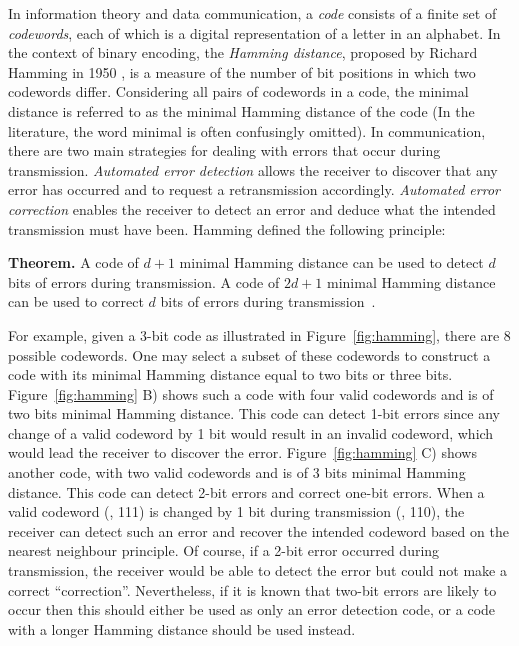 In information theory and data communication, a \emph{code} consists of a finite set of \emph{codewords}, each of which is a digital representation of a letter in an alphabet.
In the context of binary encoding, the \emph{Hamming distance}, proposed by Richard Hamming in 1950 \cite{Hamming:1950:Bell}, is a measure of the number of bit positions in which two codewords differ.
Considering all pairs of codewords in a code, the minimal distance is referred to as the minimal Hamming distance of the code (In the literature, the word minimal is often confusingly omitted).
In communication, there are two main strategies for dealing with errors that occur during transmission.
\emph{Automated error detection} allows the receiver to discover that any error has occurred and to request a retransmission accordingly.
\emph{Automated error correction} enables the receiver to detect an error and deduce what the intended transmission must have been.
Hamming defined the following principle:

\noindent \textbf{Theorem.} A code of $d+1$ minimal Hamming distance can be used to detect $d$ bits of errors during transmission. A code of $2d+1$ minimal Hamming distance can be used to correct $d$ bits of errors during transmission~\cite{Hamming:1950:Bell}.

For example, given a 3-bit code as illustrated in Figure~\ref{fig:hamming}, there are 8 possible codewords.
One may select a subset of these codewords to construct a code with its minimal Hamming distance equal to two bits or three bits.
Figure~\ref{fig:hamming} B) shows such a code with four valid codewords and is of two bits minimal Hamming distance.
This code can detect 1-bit errors since any change of a valid codeword by 1 bit would result in an invalid codeword, which would lead the receiver to discover the error.
Figure~\ref{fig:hamming} C) shows another code, with two valid codewords and is of 3 bits minimal Hamming distance.
This code can detect 2-bit errors and correct one-bit errors.
When a valid codeword (\eg, 111) is changed by 1 bit during transmission (\eg, 110), the receiver can detect such an error and recover the intended codeword based on the nearest neighbour principle.
Of course, if a 2-bit error occurred during transmission, the receiver would be able to detect the error but could not make a correct ``correction''.
Nevertheless, if it is known that two-bit errors are likely to occur then this should either be used as only an error detection code, or a code with a longer Hamming distance should be used instead.

